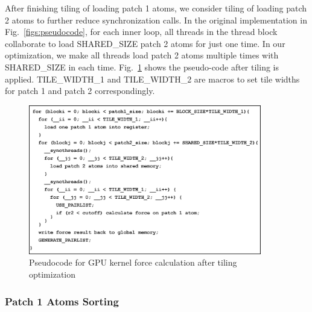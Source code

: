 After finishing tiling of loading patch 1 atoms, we consider tiling of loading patch 2 atoms to further reduce synchronization calls.
In the original implementation in Fig.~\ref{figs:pseudocode}, for each inner loop, all threads in the thread block collaborate to load SHARED\_SIZE
patch 2 atoms for just one time.
In our optimization, we make all threads load patch 2 atoms multiple times with SHARED\_SIZE in each time. Fig.~\ref{figs:pseudocode-tile} shows
the pseudo-code after tiling is applied. TILE\_WIDTH\_1 and TILE\_WIDTH\_2 are macros to set tile widths for patch 1 and patch 2 correspondingly.

\begin{figure}[h]
\centering
\setlength{\abovecaptionskip}{-1pt}
\setlength{\belowcaptionskip}{-2pt}
\includegraphics[width=4.0in]{figs/pseudocode-tile.eps}
\caption{Pseudocode for GPU kernel force calculation after tiling optimization}
\label{figs:pseudocode-tile}
\end{figure}

\subsubsection{Patch 1 Atoms Sorting}
